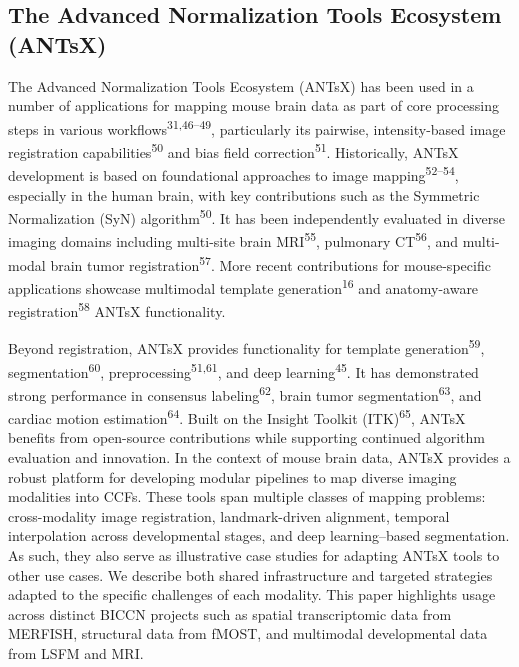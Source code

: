 \documentclass[
  12pt,
]{article}
\begin{document}
\subsection{The Advanced Normalization Tools Ecosystem
(ANTsX)}\label{the-advanced-normalization-tools-ecosystem-antsx}

The Advanced Normalization Tools Ecosystem (ANTsX) has been used in a
number of applications for mapping mouse brain data as part of core
processing steps in various workflows\textsuperscript{31,46--49},
particularly its pairwise, intensity-based image registration
capabilities\textsuperscript{50} and bias field
correction\textsuperscript{51}. Historically, ANTsX development is based
on foundational approaches to image mapping\textsuperscript{52--54},
especially in the human brain, with key contributions such as the
Symmetric Normalization (SyN) algorithm\textsuperscript{50}. It has been
independently evaluated in diverse imaging domains including multi-site
brain MRI\textsuperscript{55}, pulmonary CT\textsuperscript{56}, and
multi-modal brain tumor registration\textsuperscript{57}. More recent
contributions for mouse-specific applications showcase multimodal
template generation\textsuperscript{16} and anatomy-aware
registration\textsuperscript{58} ANTsX functionality.

Beyond registration, ANTsX provides functionality for template
generation\textsuperscript{59}, segmentation\textsuperscript{60},
preprocessing\textsuperscript{51,61}, and deep
learning\textsuperscript{45}. It has demonstrated strong performance in
consensus labeling\textsuperscript{62}, brain tumor
segmentation\textsuperscript{63}, and cardiac motion
estimation\textsuperscript{64}. Built on the Insight Toolkit
(ITK)\textsuperscript{65}, ANTsX benefits from open-source contributions
while supporting continued algorithm evaluation and innovation. In the
context of mouse brain data, ANTsX provides a robust platform for
developing modular pipelines to map diverse imaging modalities into
CCFs. These tools span multiple classes of mapping problems:
cross-modality image registration, landmark-driven alignment, temporal
interpolation across developmental stages, and deep learning--based
segmentation. As such, they also serve as illustrative case studies for
adapting ANTsX tools to other use cases. We describe both shared
infrastructure and targeted strategies adapted to the specific
challenges of each modality. This paper highlights usage across distinct
BICCN projects such as spatial transcriptomic data from MERFISH,
structural data from fMOST, and multimodal developmental data from LSFM
and MRI.
\end{document}
